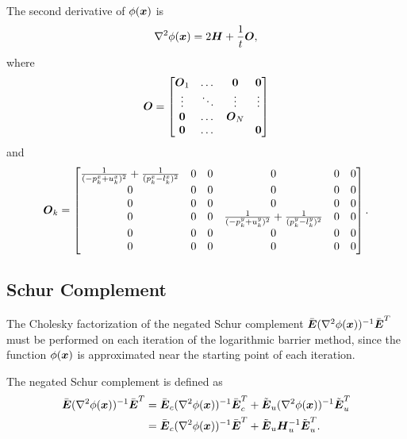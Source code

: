 The second derivative of $\phi(\mbox{\boldmath $x$})$ is
$$
\nabla^2\phi(\mbox{\boldmath $x$}) = 2\mbox{\boldmath $H$} + \frac{1}{t} \mbox{\boldmath $O$},
$$
where
$$
\mbox{\boldmath $O$} = 
\begin{bmatrix}
    \mbox{\boldmath $O$}_1   & \dots     & \mbox{\boldmath $0$}   & \mbox{\boldmath $0$}   \\
    \vdots      & \ddots    & \vdots    & \vdots    \\
    \mbox{\boldmath $0$}     & \dots     & \mbox{\boldmath $O$}_N &           \\
    \mbox{\boldmath $0$}     & \dots     &           & \mbox{\boldmath $0$}   \\
\end{bmatrix}
$$
and
$$
\mbox{\boldmath $O$}_k = 
\begin{bmatrix}
    \frac{1}{(-p_k^x + u_k^x)^2} + \frac{1}{(p_k^x - l_k^x)^2} &0 &0 &0 &0 & 0\\
    0                                                          &0 &0 &0 &0 & 0\\
    0                                                          &0 &0 &0 &0 & 0\\
    0&0 &0 & \frac{1}{(-p_k^y + u_k^y)^2} + \frac{1}{(p_k^y - l_k^y)^2} &0 & 0\\
    0                                                          &0 &0 &0 &0 & 0\\
    0                                                          &0 &0 &0 &0 & 0\\
\end{bmatrix}.
$$



\subsection{Schur Complement}
The Cholesky factorization of the negated Schur complement 
$\bar{\mbox{\boldmath $E$}} (\nabla^2\phi(\mbox{\boldmath $x$}))^{-1} \bar{\mbox{\boldmath $E$}}^T$
must be performed on each iteration of the logarithmic barrier method, since the
function $\phi(\mbox{\boldmath $x$})$ is approximated near the starting point of each iteration.

The negated Schur complement is defined as
\begin{equation*}
\begin{split}
\bar{\mbox{\boldmath $E$}} (\nabla^2\phi(\mbox{\boldmath $x$}))^{-1} \bar{\mbox{\boldmath $E$}}^T 
&=
\bar{\mbox{\boldmath $E$}}_c (\nabla^2\phi(\mbox{\boldmath $x$}))^{-1} \bar{\mbox{\boldmath $E$}}^T_c 
+
\tilde{\mbox{\boldmath $E$}}_u (\nabla^2\phi(\mbox{\boldmath $x$}))^{-1} \tilde{\mbox{\boldmath $E$}}^T_u\\
&= 
\bar{\mbox{\boldmath $E$}}_c (\nabla^2\phi(\mbox{\boldmath $x$}))^{-1} \bar{\mbox{\boldmath $E$}}^T
+
\tilde{\mbox{\boldmath $E$}}_u \mbox{\boldmath $H$}^{-1}_u \tilde{\mbox{\boldmath $E$}}^T_u.
\end{split}
\end{equation*}

